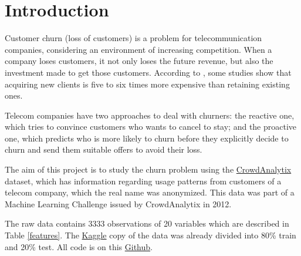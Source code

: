 \documentclass[12pt,letterpaper]{article}
\begin{document}
	\tableofcontents
	\newpage
	\section{Introduction}
	
	Customer churn (loss of customers) is a problem for telecommunication companies, considering an environment of increasing competition. When a company loses customers, it not only loses the future revenue, but also the investment made to get those customers. According to \cite{class_imbalance}, some studies show that acquiring new clients is five to six times more expensive than retaining existing ones. 
	
	Telecom companies have two approaches to deal with churners: the reactive one, which tries to convince customers who wants to cancel to stay; and the proactive one, which predicts who is more likely to churn before they explicitly decide to churn and send them suitable offers to avoid their loss.
	
	The aim of this project is to study the churn problem using the \href{https://www.crowdanalytix.com/contests/why-customer-churn/}{CrowdAnalytix} dataset, which has information regarding usage patterns from customers of a telecom company, which the real name was anonymized. This data was part of a Machine Learning Challenge issued by CrowdAnalytix in 2012.
	
	The raw data contains 3333 observations of 20 variables which are described in Table \ref{features}. The \href{https://www.kaggle.com/mnassrib/telecom-churn-datasets}{Kaggle} copy of the data was already divided into 80\% train and 20\% test. All code is on this \href{https://github.com/reneroliveira/Churn_Prediction_Project}{Github}.
	
\end{document}
